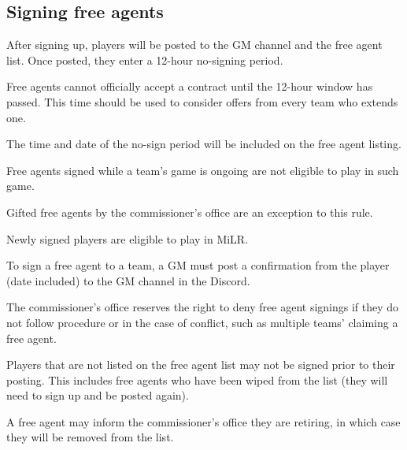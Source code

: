 \subsection{Signing free agents}
\begin{deepEnumerate}
	\item After signing up, players will be posted to the GM channel and the free agent list. Once posted, they enter a 12-hour no-signing period.
	\begin{deepEnumerate}
		\item Free agents cannot officially accept a contract until the 12-hour window has passed.
		This time should be used to consider offers from every team who extends one.
		\item The time and date of the no-sign period will be included on the free agent listing.
	\end{deepEnumerate}
	\item Free agents signed while a team's game is ongoing are not eligible to play in such game.
	\begin{deepEnumerate}
		\item Gifted free agents by the commissioner’s office are an exception to this rule.
		\item Newly signed players are eligible to play in MiLR.
	\end{deepEnumerate}
	\item To sign a free agent to a team, a GM must post a confirmation from the player	(date included) to the GM channel in the Discord.
	\item The commissioner's office reserves the right to deny free agent signings if they do not follow procedure or in the case of conflict,
	such as multiple teams' claiming a free agent.
	\item Players that are not listed on the free agent list may not be signed prior to their posting.
	This includes free agents who have been wiped from the list	(they will need to sign up and be posted again).
	\item A free agent may inform the commissioner's office they are retiring, in which case they will be removed from the list.
\end{deepEnumerate}

